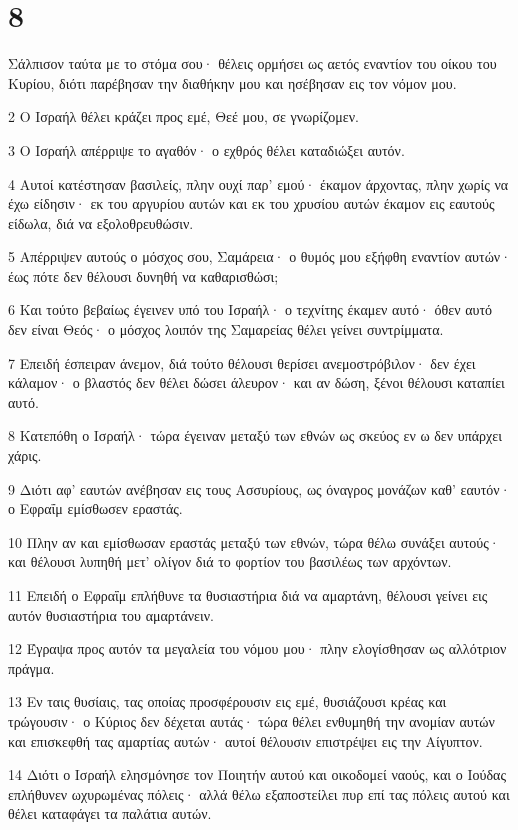 \chapter{8}

\par Σάλπισον ταύτα με το στόμα σου· θέλεις ορμήσει ως αετός εναντίον του οίκου του Κυρίου, διότι παρέβησαν την διαθήκην μου και ησέβησαν εις τον νόμον μου.
\par 2 Ο Ισραήλ θέλει κράζει προς εμέ, Θεέ μου, σε γνωρίζομεν.
\par 3 Ο Ισραήλ απέρριψε το αγαθόν· ο εχθρός θέλει καταδιώξει αυτόν.
\par 4 Αυτοί κατέστησαν βασιλείς, πλην ουχί παρ' εμού· έκαμον άρχοντας, πλην χωρίς να έχω είδησιν· εκ του αργυρίου αυτών και εκ του χρυσίου αυτών έκαμον εις εαυτούς είδωλα, διά να εξολοθρευθώσιν.
\par 5 Απέρριψεν αυτούς ο μόσχος σου, Σαμάρεια· ο θυμός μου εξήφθη εναντίον αυτών· έως πότε δεν θέλουσι δυνηθή να καθαρισθώσι;
\par 6 Και τούτο βεβαίως έγεινεν υπό του Ισραήλ· ο τεχνίτης έκαμεν αυτό· όθεν αυτό δεν είναι Θεός· ο μόσχος λοιπόν της Σαμαρείας θέλει γείνει συντρίμματα.
\par 7 Επειδή έσπειραν άνεμον, διά τούτο θέλουσι θερίσει ανεμοστρόβιλον· δεν έχει κάλαμον· ο βλαστός δεν θέλει δώσει άλευρον· και αν δώση, ξένοι θέλουσι καταπίει αυτό.
\par 8 Κατεπόθη ο Ισραήλ· τώρα έγειναν μεταξύ των εθνών ως σκεύος εν ω δεν υπάρχει χάρις.
\par 9 Διότι αφ' εαυτών ανέβησαν εις τους Ασσυρίους, ως όναγρος μονάζων καθ' εαυτόν· ο Εφραΐμ εμίσθωσεν εραστάς.
\par 10 Πλην αν και εμίσθωσαν εραστάς μεταξύ των εθνών, τώρα θέλω συνάξει αυτούς· και θέλουσι λυπηθή μετ' ολίγον διά το φορτίον του βασιλέως των αρχόντων.
\par 11 Επειδή ο Εφραΐμ επλήθυνε τα θυσιαστήρια διά να αμαρτάνη, θέλουσι γείνει εις αυτόν θυσιαστήρια του αμαρτάνειν.
\par 12 Έγραψα προς αυτόν τα μεγαλεία του νόμου μου· πλην ελογίσθησαν ως αλλότριον πράγμα.
\par 13 Εν ταις θυσίαις, τας οποίας προσφέρουσιν εις εμέ, θυσιάζουσι κρέας και τρώγουσιν· ο Κύριος δεν δέχεται αυτάς· τώρα θέλει ενθυμηθή την ανομίαν αυτών και επισκεφθή τας αμαρτίας αυτών· αυτοί θέλουσιν επιστρέψει εις την Αίγυπτον.
\par 14 Διότι ο Ισραήλ ελησμόνησε τον Ποιητήν αυτού και οικοδομεί ναούς, και ο Ιούδας επλήθυνεν ωχυρωμένας πόλεις· αλλά θέλω εξαποστείλει πυρ επί τας πόλεις αυτού και θέλει καταφάγει τα παλάτια αυτών.

